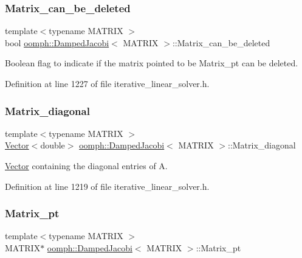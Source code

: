 \subsubsection{\texorpdfstring{Matrix\+\_\+can\+\_\+be\+\_\+deleted}{Matrix\_can\_be\_deleted}}
{\footnotesize\ttfamily template$<$typename M\+A\+T\+R\+IX $>$ \\
bool \hyperlink{classoomph_1_1DampedJacobi}{oomph\+::\+Damped\+Jacobi}$<$ M\+A\+T\+R\+IX $>$\+::Matrix\+\_\+can\+\_\+be\+\_\+deleted\hspace{0.3cm}{\ttfamily [private]}}



Boolean flag to indicate if the matrix pointed to be Matrix\+\_\+pt can be deleted. 



Definition at line 1227 of file iterative\+\_\+linear\+\_\+solver.\+h.

\mbox{\label{classoomph_1_1DampedJacobi_ac6474b25f5a309a19b417166951dfd31}} 
\subsubsection{\texorpdfstring{Matrix\+\_\+diagonal}{Matrix\_diagonal}}
{\footnotesize\ttfamily template$<$typename M\+A\+T\+R\+IX $>$ \\
\hyperlink{classoomph_1_1Vector}{Vector}$<$double$>$ \hyperlink{classoomph_1_1DampedJacobi}{oomph\+::\+Damped\+Jacobi}$<$ M\+A\+T\+R\+IX $>$\+::Matrix\+\_\+diagonal\hspace{0.3cm}{\ttfamily [private]}}



\hyperlink{classoomph_1_1Vector}{Vector} containing the diagonal entries of A. 



Definition at line 1219 of file iterative\+\_\+linear\+\_\+solver.\+h.

\mbox{\label{classoomph_1_1DampedJacobi_ad436c17f8b797ac05913955cac2df1d9}} 
\subsubsection{\texorpdfstring{Matrix\+\_\+pt}{Matrix\_pt}}
{\footnotesize\ttfamily template$<$typename M\+A\+T\+R\+IX $>$ \\
M\+A\+T\+R\+IX$\ast$ \hyperlink{classoomph_1_1DampedJacobi}{oomph\+::\+Damped\+Jacobi}$<$ M\+A\+T\+R\+IX $>$\+::Matrix\+\_\+pt\hspace{0.3cm}{\ttfamily [private]}}




